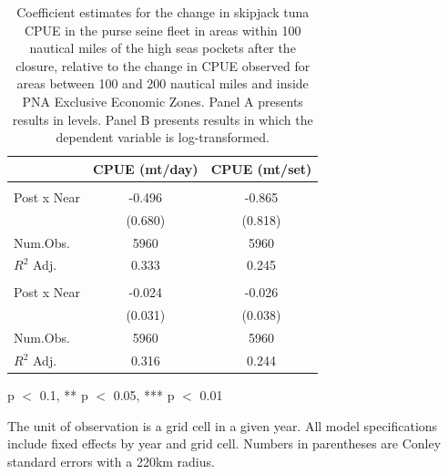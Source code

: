 \begin{table}
\centering
\begin{threeparttable}
\small
\caption{\label{tab:h3_reg_skj_ps}Coefficient estimates for the change in skipjack tuna CPUE in the purse seine fleet in
             areas within 100 nautical miles of the high seas pockets after the closure, relative to the change in CPUE
             observed for areas between 100 and 200 nautical miles and inside PNA Exclusive Economic Zones.
             Panel A presents results in levels. Panel B presents results in which the dependent variable is log-transformed.}
\centering
\begin{tabular}[t]{lcc}
\toprule
  & CPUE (mt/day) & CPUE (mt/set)\\
\midrule
\addlinespace[0.5em]
\multicolumn{3}{l}{\textit{A) Levels}}\\
\midrule \hspace{1em}Post x Near & -0.496 & -0.865\\
\hspace{1em} & (0.680) & (0.818)\\
\hspace{1em}Num.Obs. & 5960 & \vphantom{1} 5960\\
\hspace{1em}$R^2$ Adj. & 0.333 & 0.245\\
\addlinespace[0.5em]
\multicolumn{3}{l}{\textit{B) Log-transformed}}\\
\midrule \hspace{1em}Post x Near & -0.024 & -0.026\\
\hspace{1em} & (0.031) & (0.038)\\
\hspace{1em}Num.Obs. & 5960 & 5960\\
\hspace{1em}$R^2$ Adj. & 0.316 & 0.244\\
\bottomrule
\end{tabular}
\begin{tablenotes}
\small
\item * p $<$ 0.1, ** p $<$ 0.05, *** p $<$ 0.01
\item The unit of observation is a grid cell in a given year. All model specifications include fixed effects by year and grid cell. Numbers in parentheses are Conley standard errors with a 220km radius.
\end{tablenotes}
\end{threeparttable}
\end{table}
